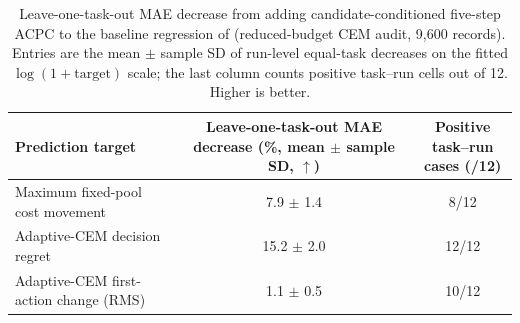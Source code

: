 \begin{table}[H]
\centering
\caption{Leave-one-task-out MAE decrease from adding candidate-conditioned five-step ACPC to the baseline regression of  (reduced-budget CEM audit, 9{,}600 records). Entries are the mean $\pm$ sample SD of run-level equal-task decreases on the fitted $\log(1+\mathrm{target})$ scale; the last column counts positive task--run cells out of 12. Higher is better.}
\label{tab:acpc-planner-increment}
\scriptsize
\setlength{\tabcolsep}{4.5pt}
\begin{tabularx}{\linewidth}{Xcc}
\toprule
Prediction target & \shortstack{Leave-one-task-out MAE decrease\\(\%, mean $\pm$ sample SD, $\uparrow$)} & \shortstack{Positive task--run\\cases (/12)} \\
\midrule
Maximum fixed-pool cost movement & 7.9 $\pm$ 1.4 & 8/12 \\
Adaptive-CEM decision regret & 15.2 $\pm$ 2.0 & 12/12 \\
Adaptive-CEM first-action change (RMS) & 1.1 $\pm$ 0.5 & 10/12 \\
\bottomrule
\end{tabularx}
\end{table}
